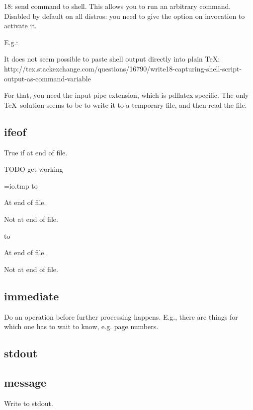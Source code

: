     18: send command to shell. This allows you to run an arbitrary command. Disabled by default on all distros: you need to give the  option on invocation to activate it.

    E.g.:

    \immediate{}

    It does not seem possible to paste shell output directly into plain \TeX: http://tex.stackexchange.com/questions/16790/write18-capturing-shell-script-output-as-command-variable

    For that, you need the input pipe extension, which is pdflatex specific. The only \TeX\ solution seems to be to write it to a temporary file, and then read the file.

  \subsection{ifeof}

    True if at end of file.

    TODO get working

    \def\eofhuman#1{
      \ifeof#1
        At end of file.\par
      \else
        Not at end of file.\par
      \fi
    }

    \newread\file
    \immediate\openin\file=io.tmp
    \immediate\read\file to \fileline
    \fileline\par
    \eofhuman\file
    \immediate\read\file to \fileline
    \fileline\par
    \eofhuman\file
    \immediate\closein\file

  \subsection{immediate}

    Do an operation before further processing happens. E.g., there are things for which one has to wait to know, e.g. page numbers.

  \subsection{stdout}

  \subsection{message}

    Write to stdout.

